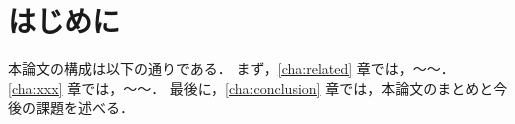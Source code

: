 \chapter{はじめに}
\label{cha:intro}



本論文の構成は以下の通りである．
まず，\ref{cha:related} 章では，～～．
\ref{cha:xxx} 章では，～～．
最後に，\ref{cha:conclusion} 章では，本論文のまとめと今後の課題を述べる．